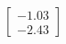 \documentclass[preview]{standalone}
\begin{document}
\begin{align*}
\begin{bmatrix} -1.03 \\ -2.43 \end{bmatrix}
\end{align*}
\end{document}

